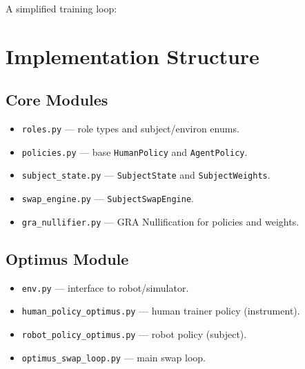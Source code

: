 \documentclass[11pt,a4paper]{article}
\begin{document}
A simplified training loop:

\begin{algorithmic}
\step
{}
\end{algorithmic}

\section{Implementation Structure}

\subsection{Core Modules}

\begin{itemize}
\item \texttt{roles.py} — role types and subject/environ enums.
\item \texttt{policies.py} — base \texttt{HumanPolicy} and \texttt{AgentPolicy}.
\item \texttt{subject_state.py} — \texttt{SubjectState} and \texttt{SubjectWeights}.
\item \texttt{swap_engine.py} — \texttt{SubjectSwapEngine}.
\item \texttt{gra_nullifier.py} — GRA Nullification for policies and weights.
\end{itemize}

\subsection{Optimus Module}

\begin{itemize}
\item \texttt{env.py} — interface to robot/simulator.
\item \texttt{human_policy_optimus.py} — human trainer policy (instrument).
\item \texttt{robot_policy_optimus.py} — robot policy (subject).
\item \texttt{optimus_swap_loop.py} — main swap loop.
\end{itemize}
\end{document}
